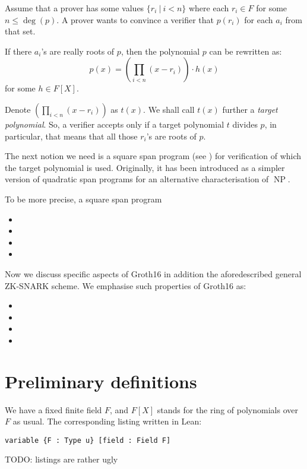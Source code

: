 \documentclass{article}
\theoremstyle{definition}
\theoremstyle{remark}
\begin{document}
Assume that a prover has some values $\{ r_i \: | \: i < n\}$ where each $r_i \in F$ for some $n \leq \deg(p)$.
A prover wants to convince a verifier that $p(r_i)$ for each $a_i$ from that set.

If there $a_i$'s are really roots of $p$, then the polynomial $p$ can be rewritten as:
\begin{equation}
p(x) = (\prod_{i < n} (x - r_i)) \cdot h(x)
\end{equation}
for some $h \in F[X]$.

Denote $(\prod_{i < n} (x - r_i))$ as $t(x)$. We shall call $t(x)$ further a \emph{target polynomial}. So, a verifier accepts only if a target polynomial $t$ divides $p$, in particular, that means that all those $r_i$'s are roots of $p$.

The next notion we need is a square span program (see \cite{danezis2014square}) for verification of which the target polynomial is used. Originally, it has been introduced as a simpler version of quadratic span programs for an alternative characterisation of $\operatorname{NP}$.

To be more precise, a square span program


\begin{itemize}
\item
\item
\item
\item
\end{itemize}

Now we discuss specific aspects of Groth16 in addition the aforedescribed general ZK-SNARK scheme.
We emphasise such properties of Groth16 as:
\begin{itemize}
\item
\item
\item
\item
\end{itemize}

\section{Preliminary definitions}

We have a fixed finite field $F$, and $F[X]$ stands for the ring of polynomials over $F$ as usual. The corresponding listing written in Lean:

\begin{lstlisting}
variable {F : Type u} [field : Field F]
\end{lstlisting}
TODO: listings are rather ugly
\end{document}
